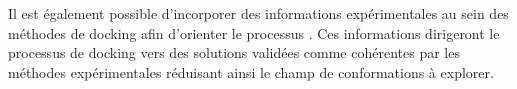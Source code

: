 Il est également possible d'incorporer des informations expérimentales au sein des méthodes de docking afin d'orienter le processus \cite{dominguez_haddock:_2003}. Ces informations dirigeront le processus de docking vers des solutions validées comme cohérentes par les méthodes expérimentales réduisant ainsi le champ de conformations à explorer.




